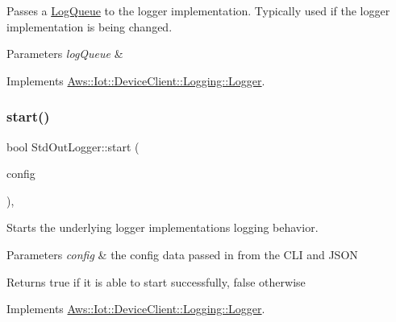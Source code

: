 Passes a \hyperlink{class_aws_1_1_iot_1_1_device_client_1_1_logging_1_1_log_queue}{Log\+Queue} to the logger implementation. Typically used if the logger implementation is being changed. 


\begin{DoxyParams}{Parameters}
{\em log\+Queue} & \\
\hline
\end{DoxyParams}


Implements \hyperlink{class_aws_1_1_iot_1_1_device_client_1_1_logging_1_1_logger_a6b80ca4200fbc58bb2994ef4319ea822}{Aws\+::\+Iot\+::\+Device\+Client\+::\+Logging\+::\+Logger}.

\mbox{\label{class_aws_1_1_iot_1_1_device_client_1_1_logging_1_1_std_out_logger_aa27086cd009717d85b957ef1740b14e9}} 
\subsubsection{\texorpdfstring{start()}{start()}}
{\footnotesize\ttfamily bool Std\+Out\+Logger\+::start (\begin{DoxyParamCaption}\item[{const \hyperlink{struct_aws_1_1_iot_1_1_device_client_1_1_plain_config}{Plain\+Config} \&}]{config }\end{DoxyParamCaption})\hspace{0.3cm}{\ttfamily [override]}, {\ttfamily [virtual]}}



Starts the underlying logger implementation\textquotesingle{}s logging behavior. 


\begin{DoxyParams}{Parameters}
{\em config} & the config data passed in from the C\+LI and J\+S\+ON \\
\hline
\end{DoxyParams}
\begin{DoxyReturn}{Returns}
true if it is able to start successfully, false otherwise 
\end{DoxyReturn}


Implements \hyperlink{class_aws_1_1_iot_1_1_device_client_1_1_logging_1_1_logger_ad42e38afcd7402f5dc1213b2f0b96961}{Aws\+::\+Iot\+::\+Device\+Client\+::\+Logging\+::\+Logger}.

